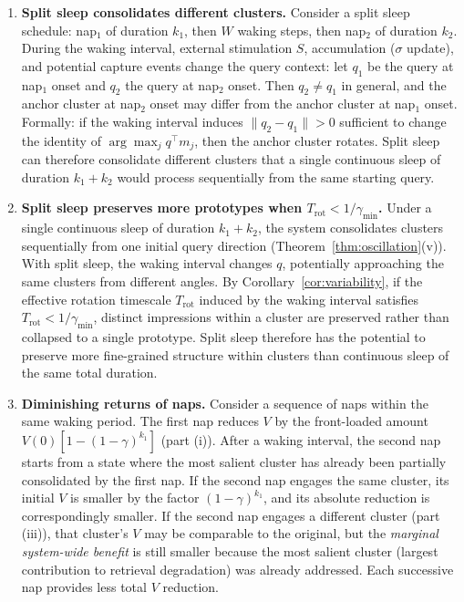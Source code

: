 \begin{theorem}
\begin{enumerate}
\item \textbf{Split sleep consolidates different clusters.}
Consider a split sleep schedule: nap$_1$ of duration $k_1$, then $W$
waking steps, then nap$_2$ of duration $k_2$.  During the waking
interval, external stimulation $S$, accumulation ($\sigma$ update), and
potential capture events change the query context: let $q_1$ be the
query at nap$_1$ onset and $q_2$ the query at nap$_2$ onset.  Then
$q_2 \neq q_1$ in general, and the anchor cluster at nap$_2$ onset may
differ from the anchor cluster at nap$_1$ onset.  Formally: if the
waking interval induces $\|q_2 - q_1\| > 0$ sufficient to change the
identity of $\arg\max_j q^\top m_j$, then the anchor cluster rotates.
Split sleep can therefore consolidate different clusters that a single
continuous sleep of duration $k_1 + k_2$ would process sequentially
from the same starting query.

\item \textbf{Split sleep preserves more prototypes when $T_{\mathrm{rot}} < 1/\gamma_{\min}$.}  Under a
single continuous sleep of duration $k_1 + k_2$, the system
consolidates clusters sequentially from one initial query direction
(Theorem~\ref{thm:oscillation}(v)).  With split sleep, the waking
interval changes $q$, potentially approaching the same clusters from
different angles.  By Corollary~\ref{cor:variability},
if the effective rotation timescale $T_{\mathrm{rot}}$ induced by the
waking interval satisfies $T_{\mathrm{rot}} < 1/\gamma_{\min}$, distinct
impressions within a cluster are preserved rather than collapsed to a
single prototype.  Split sleep therefore has the potential to preserve
more fine-grained structure within clusters than continuous sleep of
the same total duration.

\item \textbf{Diminishing returns of naps.}
Consider a sequence of naps within the same waking period.  The first
nap reduces $V$ by the front-loaded amount $V(0)[1 - (1-\gamma)^{k_1}]$
(part (i)).  After a waking interval, the second nap starts from a state
where the most salient cluster has already been partially consolidated
by the first nap.  If the second nap engages the same cluster, its
initial $V$ is smaller by the factor $(1 - \gamma)^{k_1}$, and its
absolute reduction is correspondingly smaller.  If the second nap
engages a different cluster (part (iii)), that cluster's $V$ may be
comparable to the original, but the \emph{marginal system-wide benefit}
is still smaller because the most salient cluster (largest contribution
to retrieval degradation) was already addressed.  Each successive nap
provides less total $V$ reduction.
\end{enumerate}
\end{theorem}

